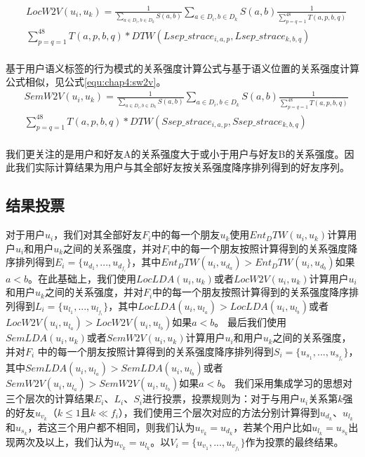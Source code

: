 \begin{equation}
\label{equ:chap4:lw2v}
\begin{split}
&LocW2V(u_{i},u_{k})=\frac{1}{\sum_{a\in D_{i},b\in D_{k}}S(a,b)}\sum_{a\in D_{i},b\in D_{k}}S(a,b)\frac{1}{\sum_{p=q=1}^{48}T(a,p,b,q)}\\
&\sum_{p=q=1}^{48}T(a,p,b,q)\ast DTW(Lsep\_strace_{i,a,p},Lsep\_strace_{k,b,q})\\
\end{split}
\end{equation}
\par 基于用户语义标签的行为模式的关系强度计算公式与基于语义位置的关系强度计算公式相似，见公式\ref{equ:chap4:sw2v}。
\begin{equation}
\label{equ:chap4:sw2v}
\begin{split}
&SemW2V(u_{i},u_{k})=\frac{1}{\sum_{a\in D_{i},b\in D_{k}}S(a,b)}\sum_{a\in D_{i},b\in D_{k}}S(a,b)\frac{1}{\sum_{p=q=1}^{48}T(a,p,b,q)}\\
&\sum_{p=q=1}^{48}T(a,p,b,q)\ast DTW(Ssep\_strace_{i,a,p},Ssep\_strace_{k,b,q})\\
\end{split}
\end{equation}
\par 我们更关注的是用户和好友A的关系强度大于或小于用户与好友B的关系强度。因此我们实际计算结果为用户与其全部好友按关系强度降序排列得到的好友序列。
\subsection{结果投票}
对于用户$u_{i}$，我们对其全部好友$F_{i}$中的每一个朋友$u_{k}$使用$Ent_DTW(u_{i},u_{k})$计算用户$u_{i}$和用户$u_{k}$之间的关系强度，并对$F_{i}$中的每一个朋友按照计算得到的关系强度降序排列得到$E_{i}=\{u_{d_{1}},...,u_{d_{f_{i}}}\}$，其中$Ent_DTW(u_{i},u_{d_{a}})>Ent_DTW(u_{i},u_{d_{b}})$如果$a<b$。在此基础上，我们使用$LocLDA(u_{i},u_{k})$或者$LocW2V(u_{i},u_{k})$计算用户$u_{i}$和用户$u_{k}$之间的关系强度，并对$F_{i}$中的每一个朋友按照计算得到的关系强度降序排列得到$L_{i}=\{u_{l_{1}},...,u_{l_{f_{i}}}\}$，其中$LocLDA(u_{i},u_{l_{a}})>LocLDA(u_{i},u_{l_{b}})$或者$LocW2V(u_{i},u_{l_{a}})>LocW2V(u_{i},u_{l_{b}})$如果$a<b$。 最后我们使用$SemLDA(u_{i},u_{k})$或者$SemW2V(u_{i},u_{k})$计算用户$u_{i}$和用户$u_{k}$之间的关系强度，并对$F_{i}$ 中的每一个朋友按照计算得到的关系强度降序排列得到$S_{i}=\{u_{s_{1}},...,u_{s_{f_{i}}}\}$，其中$SemLDA(u_{i},u_{l_{a}})>SemLDA(u_{i},u_{l_{b}})$或者$SemW2V(u_{i},u_{l_{a}})>SemW2V(u_{i},u_{l_{b}})$如果$a<b$。 我们采用集成学习的思想对三个层次的计算结果$E_{i}$、$L_{i}$、$S_{i}$进行投票，投票规则为：对于与用户$u_{i}$关系第$k$强的好友$u_{v_{k}}$（$k\leq 1$且$k\ll f_{i}$），我们使用三个层次对应的方法分别计算得到$u_{d_{k}}$、$u_{l_{k}}$ 和$u_{s_{k}}$，若这三个用户都不相同，则我们认为$u_{v_{k}}=u_{d_{k}}$，若某个用户比如$u_{l_{k}}=u_{s_{k}}$出现两次及以上，我们认为$u_{v_{k}}=u_{l_{k}}$。以$V_{i}=\{u_{v_{1}},...,u_{v_{f_{1}}}\}$作为投票的最终结果。
